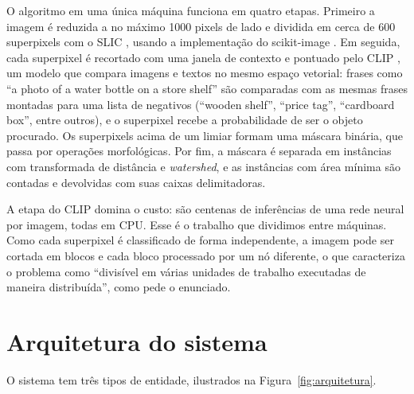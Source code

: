 \documentclass{sbc2023}
\begin{document}
O algoritmo em uma única máquina funciona em quatro etapas. Primeiro a imagem é reduzida a no máximo 1000 pixels de lado e dividida em cerca de 600 superpixels com o SLIC \citep{achanta2012}, usando a implementação do scikit-image \citep{vanderwalt2014}. Em seguida, cada superpixel é recortado com uma janela de contexto e pontuado pelo CLIP \citep{radford2021}, um modelo que compara imagens e textos no mesmo espaço vetorial: frases como ``a photo of a water bottle on a store shelf'' são comparadas com as mesmas frases montadas para uma lista de negativos (``wooden shelf'', ``price tag'', ``cardboard box'', entre outros), e o superpixel recebe a probabilidade de ser o objeto procurado. Os superpixels acima de um limiar formam uma máscara binária, que passa por operações morfológicas. Por fim, a máscara é separada em instâncias com transformada de distância e \emph{watershed}, e as instâncias com área mínima são contadas e devolvidas com suas caixas delimitadoras.

A etapa do CLIP domina o custo: são centenas de inferências de uma rede neural por imagem, todas em CPU. Esse é o trabalho que dividimos entre máquinas. Como cada superpixel é classificado de forma independente, a imagem pode ser cortada em blocos e cada bloco processado por um nó diferente, o que caracteriza o problema como ``divisível em várias unidades de trabalho executadas de maneira distribuída'', como pede o enunciado.

\section{Arquitetura do sistema}
\label{sec:arquitetura}

O sistema tem três tipos de entidade, ilustrados na Figura~\ref{fig:arquitetura}.
\end{document}
